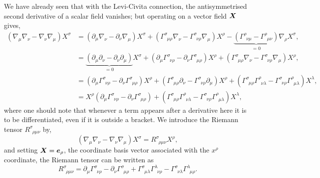 We have already seen that with the Levi-Civita connection, the antisymmetrised second derivative of a scalar field vanishes; but operating on a vector field $\boldsymbol{X}$ gives,
\begin{align}
(\nabla_\mu \nabla_\nu  - \nabla_\nu \nabla_\mu )X^\sigma &=(\partial_\mu \nabla_\nu  - \partial_\nu \nabla_\mu )X^\sigma + (\Gamma^{\sigma}_{\,\,\,\mu\rho}\nabla_\nu -\Gamma^{\sigma}_{\,\,\,\nu\rho}\nabla_\mu  )X^\rho - \underbrace{(\Gamma^{\rho}_{\,\,\,\nu\mu} - \Gamma^{\rho}_{\,\,\,\mu\nu})}_{=0}\nabla_\rho X^\sigma , \\
                         &=\underbrace{(\partial_\mu \partial_\nu  - \partial_\nu \partial_\mu )}_{=0}X^\sigma + (\partial_\mu \Gamma^\sigma_{\,\,\,\nu\rho}  - \partial_\nu \Gamma^\sigma_{\,\,\,\mu\rho} )X^\rho + (\Gamma^{\sigma}_{\,\,\,\mu\rho}\nabla_\nu -\Gamma^{\sigma}_{\,\,\,\nu\rho}\nabla_\mu  )X^\rho  , \\
                         &=(\partial_\mu \Gamma^\sigma_{\,\,\,\nu\rho}  - \partial_\nu \Gamma^\sigma_{\,\,\,\mu\rho} )X^\rho + (\Gamma^{\sigma}_{\,\,\,\mu\rho}\partial_\nu -\Gamma^{\sigma}_{\,\,\,\nu\rho}\partial_\mu  )X^\rho
                         + (\Gamma^{\sigma}_{\,\,\,\mu\rho}\Gamma^\rho_{\,\,\,\nu\lambda} -\Gamma^{\sigma}_{\,\,\,\nu\rho}\Gamma^\rho_{\,\,\,\mu\lambda} )X^\lambda,\\
                         &=X^\rho(\partial_\mu \Gamma^\sigma_{\,\,\,\nu\rho}  - \partial_\nu \Gamma^\sigma_{\,\,\,\mu\rho} ) + (\Gamma^{\sigma}_{\,\,\,\mu\rho}\Gamma^\rho_{\,\,\,\nu\lambda} -\Gamma^{\sigma}_{\,\,\,\nu\rho}\Gamma^\rho_{\,\,\,\mu\lambda} )X^\lambda,
\end{align}
where one should note that whenever a term appears after a derivative here it is to be differentiated, even if it is outside a bracket. We introduce the Riemann tensor $R^\sigma_{\,\,\,\rho\mu\nu}$ by,
\begin{equation}
(\nabla_\mu \nabla_\nu  - \nabla_\nu \nabla_\mu )X^\sigma = R^\sigma_{\,\,\,\rho\mu\nu} X^\rho,
\end{equation}
and setting $\boldsymbol{X} = \boldsymbol{e}_{\rho}$, the coordinate basis vector associated with the $x^\rho$ coordinate, the Riemann tensor can be written as
\begin{equation}
R^\sigma_{\,\,\,\rho\mu\nu} = \partial_\mu \Gamma^\sigma_{\,\,\,\nu\rho}  - \partial_\nu \Gamma^\sigma_{\,\,\,\mu\rho}  + \Gamma^{\sigma}_{\,\,\,\mu\lambda}\Gamma^\lambda_{\,\,\,\nu\rho} -\Gamma^{\sigma}_{\,\,\,\nu\lambda}\Gamma^\lambda_{\,\,\,\mu\rho}.
\end{equation}

